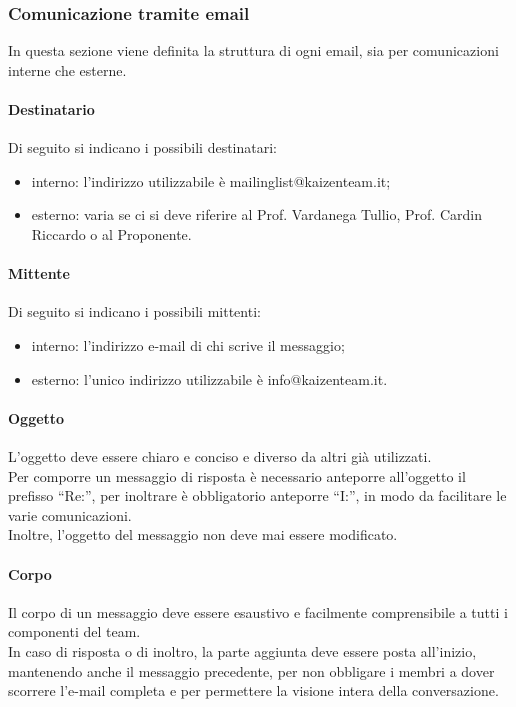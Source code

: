 		\subsubsection{Comunicazione tramite email}
			In questa sezione viene definita la struttura di ogni email, sia per comunicazioni interne che esterne.
			\paragraph{Destinatario}
				Di seguito si indicano i possibili destinatari:
				\begin{itemize}
					\item interno: l’indirizzo utilizzabile è mailinglist@kaizenteam.it;
					\item esterno: varia se ci si deve riferire al Prof. Vardanega Tullio, Prof. Cardin Riccardo o al Proponente.
				\end{itemize}
			\paragraph{Mittente}
				Di seguito si indicano i possibili mittenti:
				\begin{itemize}
					\item interno: l’indirizzo e-mail di chi scrive il messaggio;
					\item esterno: l’unico indirizzo utilizzabile è info@kaizenteam.it.
				\end{itemize}
			\paragraph{Oggetto}
				L’oggetto deve essere chiaro e conciso e diverso da altri già utilizzati.\\
				Per comporre un messaggio di risposta è necessario anteporre all’oggetto il prefisso “Re:”, per inoltrare è obbligatorio anteporre “I:”, in modo da facilitare le varie comunicazioni.\\
				Inoltre, l’oggetto del messaggio non deve mai essere modificato.
			\paragraph{Corpo}
				Il corpo di un messaggio deve essere esaustivo e facilmente comprensibile a tutti i componenti del team.\\
				In caso di risposta o di inoltro, la parte aggiunta deve essere posta all’inizio, mantenendo anche il messaggio precedente, per non obbligare i membri a dover scorrere l’e-mail completa e per permettere la visione intera della conversazione.
